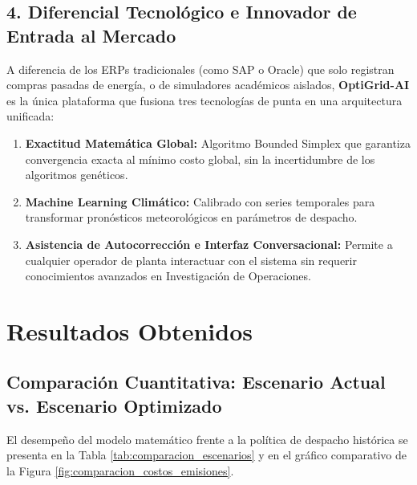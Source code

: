\documentclass[11pt,a4paper]{article}
\begin{document}
\subsection{4. Diferencial Tecnológico e Innovador de Entrada al Mercado}
A diferencia de los ERPs tradicionales (como SAP o Oracle) que solo registran compras pasadas de energía, o de simuladores académicos aislados, \textbf{OptiGrid-AI} es la única plataforma que fusiona tres tecnologías de punta en una arquitectura unificada:
\begin{enumerate}
    \item \textbf{Exactitud Matemática Global:} Algoritmo Bounded Simplex que garantiza convergencia exacta al mínimo costo global, sin la incertidumbre de los algoritmos genéticos.
    \item \textbf{Machine Learning Climático:} Calibrado con series temporales para transformar pronósticos meteorológicos en parámetros de despacho.
    \item \textbf{Asistencia de Autocorrección e Interfaz Conversacional:} Permite a cualquier operador de planta interactuar con el sistema sin requerir conocimientos avanzados en Investigación de Operaciones.
\end{enumerate}

\section{Resultados Obtenidos}

\subsection{Comparación Cuantitativa: Escenario Actual vs. Escenario Optimizado}
El desempeño del modelo matemático frente a la política de despacho histórica se presenta en la Tabla \ref{tab:comparacion_escenarios} y en el gráfico comparativo de la Figura \ref{fig:comparacion_costos_emisiones}.
\end{document}
